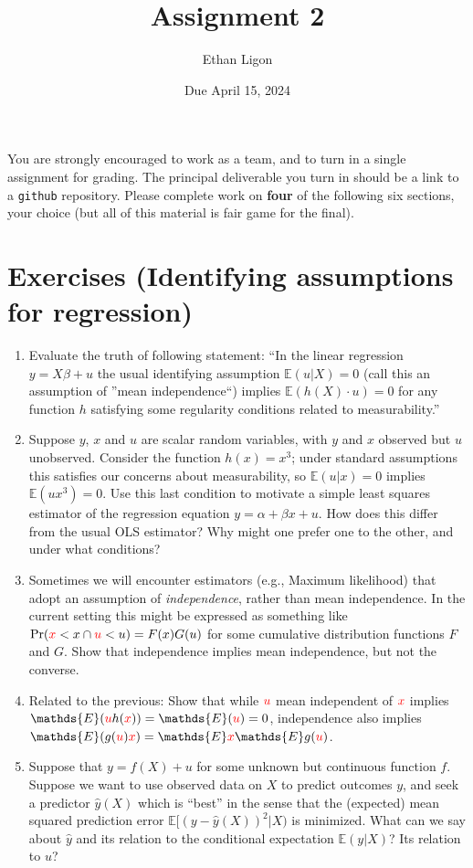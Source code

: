 \documentclass[12pt]{amsart}
\author{Ethan Ligon}
\date{Due April 15, 2024}
\title{Assignment 2}
\newcommand{\rv}[1]{\ensuremath{\textcolor{red}{#1}{}}}
\newcommand{\rvx}{\rv{x}}
\newcommand{\rvu}{\rv{u}}
\renewcommand{\E}{\ensuremath{\mathds{E}}}
\begin{document}
\maketitle
You are strongly encouraged to work as a  team, and to turn in a single assignment for grading.   The principal deliverable you turn in should be a link to a \texttt{github} repository.  Please complete work on \textbf{four} of the following six sections, your choice (but all of this material is fair game for the final).
\section{Exercises (Identifying assumptions for regression)}
\label{sec:org03f8784}

\begin{enumerate}
\item Evaluate the truth of following statement: ``In the linear regression \(y=X\beta + u\) the usual identifying assumption \(\E(u|X)=0\) (call this an assumption of ''mean independence``) implies \(\E(h(X)\cdot u)=0\) for any function \(h\) satisfying some regularity conditions related to measurability.''

\item Suppose \(y\), \(x\) and \(u\) are scalar random variables, with \(y\) and \(x\) observed but \(u\) unobserved.  Consider the function \(h(x)=x^3\); under standard assumptions this satisfies our concerns about measurability, so \(\E(u|x)=0\) implies \(\E(ux^3)=0\).   Use this last condition to motivate a simple least squares estimator of the regression equation \(y=\alpha + \beta x + u\).  How does this differ from the usual OLS estimator?  Why might one prefer one to the other, and under what conditions?

\item Sometimes we will encounter estimators (e.g., Maximum likelihood) that adopt an assumption of \emph{independence}, rather than mean independence.  In the current setting this might be expressed as something like \(\mbox{Pr}(\rvx<x \cap \rvu<u)=F(x)G(u)\) for some cumulative distribution functions \(F\) and \(G\).  Show that independence implies mean independence, but not the converse.

\item Related to the previous: Show that while \(\rvu\) mean independent of \(\rvx\) implies \(\E(\rvu h(\rvx))=\E(\rvu)=0\), independence also implies \(\E(g(\rvu)\rvx)=\E \rvx\E g(\rvu)\).

\item Suppose that \(y=f(X)+u\) for some unknown but continuous function \(f\).  Suppose we want to use observed data on \(X\) to predict outcomes \(y\), and seek a predictor \(\hat{y}(X)\) which is ``best'' in the sense that the (expected) mean squared prediction error \(\E [(y-\hat{y}(X))^2|X)\) is minimized.  What can we say about \(\hat{y}\) and its relation to the conditional expectation \(\E(y|X)\)?  Its relation to \(u\)?


\end{enumerate}
\end{document}
